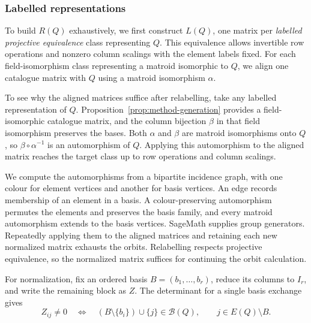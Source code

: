 \documentclass[11pt,letterpaper,titlepage]{article}
\def\B{\mathcal{B}}
\begin{document}
\subsubsection{Labelled representations}

To build \(R(Q)\) exhaustively, we first construct \(L(Q)\), one matrix per \emph{labelled projective equivalence} class representing \(Q\). This equivalence allows invertible row operations and nonzero column scalings with the element labels fixed. For each field-isomorphism class representing a matroid isomorphic to \(Q\), we align one catalogue matrix with \(Q\) using a matroid isomorphism \(\alpha\).

To see why the aligned matrices suffice after relabelling, take any labelled representation of \(Q\). Proposition~\ref{prop:method-generation} provides a field-isomorphic catalogue matrix, and the column bijection \(\beta\) in that field isomorphism preserves the bases. Both \(\alpha\) and \(\beta\) are matroid isomorphisms onto \(Q\), so \(\beta\circ\alpha^{-1}\) is an automorphism of \(Q\). Applying this automorphism to the aligned matrix reaches the target class up to row operations and column scalings.

We compute the automorphisms from a bipartite incidence graph, with one colour for element vertices and another for basis vertices. An edge records membership of an element in a basis. A colour-preserving automorphism permutes the elements and preserves the basis family, and every matroid automorphism extends to the basis vertices. SageMath supplies group generators. Repeatedly applying them to the aligned matrices and retaining each new normalized matrix exhausts the orbits. Relabelling respects projective equivalence, so the normalized matrix suffices for continuing the orbit calculation.

For normalization, fix an ordered basis \(B=(b_1,\ldots,b_r)\), reduce its columns to \(I_r\), and write the remaining block as \(Z\). The determinant for a single basis exchange gives
\[
 Z_{ij}\ne0\quad\Longleftrightarrow\quad
 (B\setminus\{b_i\})\cup\{j\}\in\B(Q),\qquad j\in E(Q)\setminus B.
\]
\end{document}
